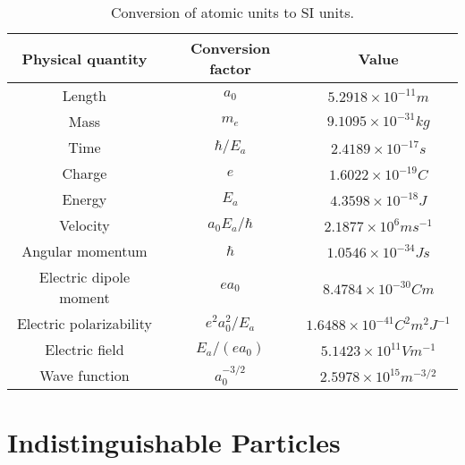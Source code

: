         \begin{table}
            \centering
            \caption{Conversion of atomic units to SI units.}
            \begin{tabular}{ccc} \hline
                Physical quantity & Conversion factor & Value \\ \hline
                Length  & $a_0$ & $5.2918 \times 10^{-11} m$ \\
                Mass    & $m_e$ & $9.1095 \times 10^{-31} kg$ \\
                Time    & $\hbar/E_a$ & $2.4189 \times 10^{-17} s$ \\
                Charge  & $e$   & $1.6022 \times 10^{-19} C$ \\
                Energy  & $E_a$ & $4.3598 \times 10^{-18} J$ \\
                Velocity& $a_0E_a/\hbar$ & $2.1877 \times 10^{6} ms^{-1}$ \\
                Angular momentum & $\hbar$ &  $1.0546 \times 10^{-34} Js$ \\
                Electric dipole moment & $ea_0$& $8.4784 \times 10^{-30} Cm$ \\
                Electric polarizability & $e^2a_0^2/E_a$ & $1.6488 \times 10^{-41} C^2m^2J^{-1}$ \\
                Electric field & $E_a/(ea_0)$ & $5.1423 \times 10^{11} Vm^{-1} $ \\
                Wave function & $a_0^{-3/2}$ & $2.5978 \times 10^{15} m^{-3/2}$ \\ \hline
            \end{tabular}
            \label{tab:atomic_units_conversion}
        \end{table}


    \section{Indistinguishable Particles}

